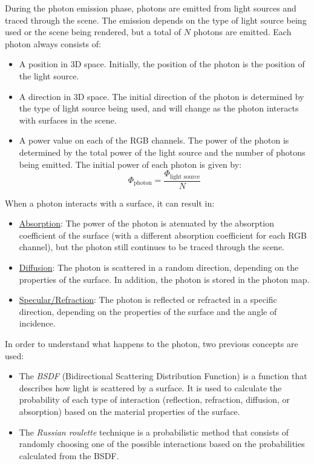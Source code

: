 During the photon emission phase, photons are emitted from light sources and traced through the scene. The emission depends on the type of light source being used or the scene being rendered, but a total of $N$ photons are emitted. Each photon always consists of:
\begin{itemize}
    \item A position in 3D space. Initially, the position of the photon is the position of the light source.
    \item A direction in 3D space. The initial direction of the photon is determined by the type of light source being used, and will change as the photon interacts with surfaces in the scene.
    \item A power value on each of the RGB channels. The power of the photon is determined by the total power of the light source and the number of photons being emitted. The initial power of each photon is given by:
    \begin{equation*}
        \Phi_{\text{photon}} = \frac{\Phi_{\text{light source}}}{N}
    \end{equation*}
\end{itemize}

When a photon interacts with a surface, it can result in:
\begin{itemize}
    \item \ul{Absorption}: The power of the photon is atenuated by the absorption coefficient of the surface (with a different absorption coefficient for each RGB channel), but the photon still continues to be traced through the scene.
    \item \ul{Diffusion}: The photon is scattered in a random direction, depending on the properties of the surface. In addition, the photon is stored in the photon map.
    \item \ul{Specular/Refraction}: The photon is reflected or refracted in a specific direction, depending on the properties of the surface and the angle of incidence.
\end{itemize}
    
In order to understand what happens to the photon, two previous concepts are used:
\begin{itemize}
    \item The \emph{BSDF} (Bidirectional Scattering Distribution Function) is a function that describes how light is scattered by a surface. It is used to calculate the probability of each type of interaction (reflection, refraction, diffusion, or absorption) based on the material properties of the surface.
    \item The \emph{Russian roulette} technique is a probabilistic method that consists of randomly choosing one of the possible interactions based on the probabilities calculated from the BSDF.
\end{itemize}

